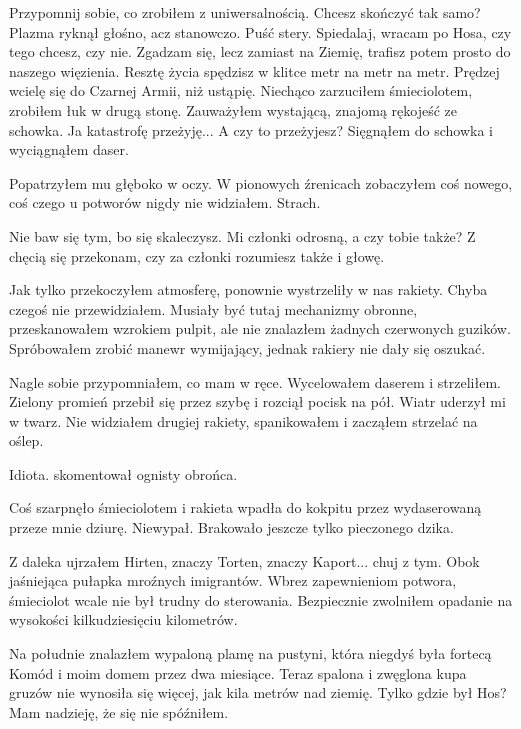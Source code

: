 \begin{dialogue}
\ds{} Przypomnij sobie, co zrobiłem z uniwersalnością. Chcesz skończyć tak samo? \dm{} Plazma ryknął głośno, acz stanowczo. \dm{} Puść stery.
\ds{} Spiedalaj, wracam po Hosa, czy tego chcesz, czy nie.
\ds{} Zgadzam się, lecz zamiast na Ziemię, trafisz potem prosto do naszego więzienia. Resztę życia spędzisz w klitce metr na metr na metr.
\ds{} Prędzej wcielę się do Czarnej Armii, niż ustąpię. \dm{} Niechąco zarzuciłem śmieciolotem, zrobiłem łuk w drugą stonę. Zauważyłem wystającą, znajomą rękojeść ze schowka.
\ds{} Ja katastrofę przeżyję...
\ds{} A czy to przeżyjesz? \dm{} Sięgnąłem do schowka i wyciągnąłem daser. 
\end{dialogue}
Popatrzyłem mu głęboko w oczy. W pionowych źrenicach zobaczyłem coś nowego, coś czego u potworów nigdy nie widziałem. Strach.

\begin{dialogue}
\ds{} Nie baw się tym, bo się skaleczysz. Mi członki odrosną, a czy tobie także?
\ds{} Z chęcią się przekonam, czy za członki rozumiesz także i głowę.
\end{dialogue}

Jak tylko przekoczyłem atmosferę, ponownie wystrzeliły w nas rakiety.
Chyba czegoś nie przewidziałem.
Musiały być tutaj mechanizmy obronne, przeskanowałem wzrokiem pulpit, ale nie znalazłem żadnych czerwonych guzików.
Spróbowałem zrobić manewr wymijający, jednak rakiery nie dały się oszukać.

Nagle sobie przypomniałem, co mam w ręce.
Wycelowałem daserem i strzeliłem.
Zielony promień przebił się przez szybę i rozciął pocisk na pół.
Wiatr uderzył mi w twarz.
Nie widziałem drugiej rakiety, spanikowałem i zacząłem strzelać na oślep.
\begin{dialogue}
\ds{} Idiota. \dm{} skomentował ognisty obrońca.
\end{dialogue}

Coś szarpnęło śmieciolotem i rakieta wpadła do kokpitu przez wydaserowaną przeze mnie dziurę. Niewypał.
Brakowało jeszcze tylko pieczonego dzika.

Z daleka ujrzałem Hirten, znaczy Torten, znaczy Kaport... chuj z tym.
Obok jaśniejąca pułapka mroźnych imigrantów.
Wbrez zapewnieniom potwora, śmieciolot wcale nie był trudny do sterowania.
Bezpiecznie zwolniłem opadanie na wysokości kilkudziesięciu kilometrów.

Na południe znalazłem wypaloną plamę na pustyni, która niegdyś była fortecą Komód i moim domem przez dwa miesiące.
Teraz spalona i zwęglona kupa gruzów nie wynosiła się więcej, jak kila metrów nad ziemię.
Tylko gdzie był Hos? Mam nadzieję, że się nie spóźniłem.


